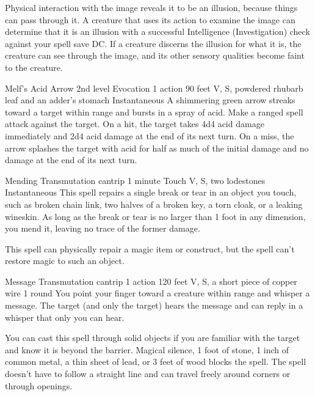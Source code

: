 \documentclass[10pt,a4paper,twoside,bg=print,twocolumn,openany,nodeprecatedcode]{dndbook}
\begin{document}
Physical interaction with the image reveals it to be an illusion, because things can pass through it. A creature that uses its action to examine the image can determine that it is an illusion with a successful Intelligence (Investigation) check against your spell save DC. If a creature discerns the illusion for what it is, the creature can see through the image, and its other sensory qualities become faint to the creature.



\DndSpellHeader%
{Melf's Acid Arrow}
{2nd level Evocation}
{1 action}
{90 feet}
{V, S, powdered rhubarb leaf and an adder's stomach}
{Instantaneous}
A shimmering green arrow streaks toward a target within range and bursts in a spray of acid. Make a ranged spell attack against the target. On a hit, the target takes 4d4 acid damage immediately and 2d4 acid damage at the end of its next turn. On a miss, the arrow splashes the target with acid for half as much of the initial damage and no damage at the end of its next turn.



\DndSpellHeader%
{Mending}
{Transmutation cantrip}
{1 minute}
{Touch}
{V, S, two lodestones}
{Instantaneous}
This spell repairs a single break or tear in an object you touch, such as broken chain link, two halves of a broken key, a torn cloak, or a leaking wineskin. As long as the break or tear is no larger than 1 foot in any dimension, you mend it, leaving no trace of the former damage.

This spell can physically repair a magic item or construct, but the spell can't restore magic to such an object.



\DndSpellHeader%
{Message}
{Transmutation cantrip}
{1 action}
{120 feet}
{V, S, a short piece of copper wire}
{1 round}
You point your finger toward a creature within range and whisper a message. The target (and only the target) hears the message and can reply in a whisper that only you can hear.

You can cast this spell through solid objects if you are familiar with the target and know it is beyond the barrier. Magical silence, 1 foot of stone, 1 inch of common metal, a thin sheet of lead, or 3 feet of wood blocks the spell. The spell doesn't have to follow a straight line and can travel freely around corners or through openings.

\end{document}
